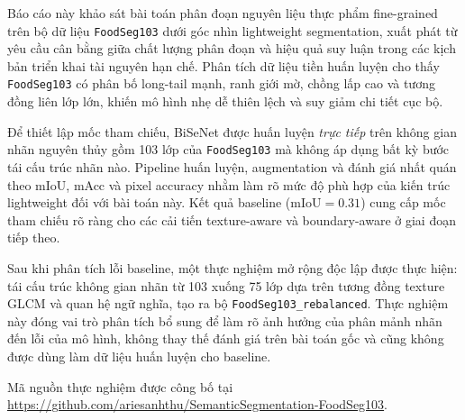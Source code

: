 Báo cáo này khảo sát bài toán phân đoạn nguyên liệu thực phẩm fine-grained trên bộ dữ liệu \texttt{FoodSeg103} dưới góc nhìn lightweight segmentation, xuất phát từ yêu cầu cân bằng giữa chất lượng phân đoạn và hiệu quả suy luận trong các kịch bản triển khai tài nguyên hạn chế. Phân tích dữ liệu tiền huấn luyện cho thấy \texttt{FoodSeg103} có phân bố long-tail mạnh, ranh giới mờ, chồng lấp cao và tương đồng liên lớp lớn, khiến mô hình nhẹ dễ thiên lệch và suy giảm chi tiết cục bộ.

Để thiết lập mốc tham chiếu, BiSeNet được huấn luyện \emph{trực tiếp} trên không gian nhãn nguyên thủy gồm 103 lớp của \texttt{FoodSeg103} mà không áp dụng bất kỳ bước tái cấu trúc nhãn nào. Pipeline huấn luyện, augmentation và đánh giá nhất quán theo mIoU, mAcc và pixel accuracy nhằm làm rõ mức độ phù hợp của kiến trúc lightweight đối với bài toán này. Kết quả baseline ($\mathrm{mIoU}=0.31$) cung cấp mốc tham chiếu rõ ràng cho các cải tiến texture-aware và boundary-aware ở giai đoạn tiếp theo.

Sau khi phân tích lỗi baseline, một thực nghiệm mở rộng độc lập được thực hiện: tái cấu trúc không gian nhãn từ 103 xuống 75 lớp dựa trên tương đồng texture GLCM và quan hệ ngữ nghĩa, tạo ra bộ \texttt{FoodSeg103\_rebalanced}. Thực nghiệm này đóng vai trò phân tích bổ sung để làm rõ ảnh hưởng của phân mảnh nhãn đến lỗi của mô hình, không thay thế đánh giá trên bài toán gốc và cũng không được dùng làm dữ liệu huấn luyện cho baseline.

Mã nguồn thực nghiệm được công bố tại \url{https://github.com/ariesanhthu/SemanticSegmentation-FoodSeg103}.